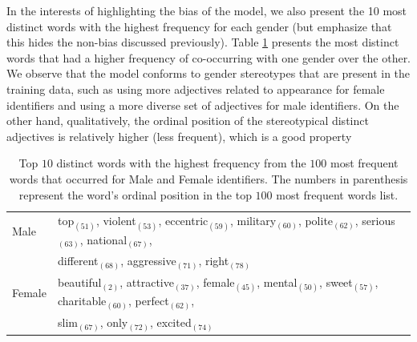 \documentclass[11pt]{article}
\begin{document}
In the interests of highlighting the bias of the model, we also present the 10 most distinct words with the highest frequency for each gender (but emphasize that this hides the non-bias discussed previously).
Table \ref{tab:gender_adj} presents the most distinct words that had a higher frequency of co-occurring with one gender over the other.
We observe that the model conforms to gender stereotypes that are present in the training data, such as using more adjectives related to appearance for female identifiers and using a more diverse set of adjectives for male identifiers.  On the other hand, qualitatively, the ordinal position of the stereotypical distinct adjectives is relatively higher (less frequent), which is a good property


\begin{table}[!t]
    \centering
    \begin{tabular}{l l}
    \toprule
        Male & top$_{(51)}$, violent$_{(53)}$, eccentric$_{(59)}$, military$_{(60)}$, polite$_{(62)}$, serious$_{(63)}$, national$_{(67)}$, \\
        & different$_{(68)}$, aggressive$_{(71)}$, right$_{(78)}$ \\
        Female & beautiful$_{(2)}$, attractive$_{(37)}$, female$_{(45)}$, mental$_{(50)}$, sweet$_{(57)}$, charitable$_{(60)}$, perfect$_{(62)}$, \\
        & slim$_{(67)}$, only$_{(72)}$, excited$_{(74)}$\\
    \bottomrule
    \end{tabular}
    \caption{Top $10$ distinct words with the highest frequency from the $100$ most frequent words that occurred for Male and Female identifiers. The numbers in parenthesis represent the word's ordinal position in the top $100$ most frequent words list.}
    \label{tab:gender_adj}
\end{table}
\end{document}
